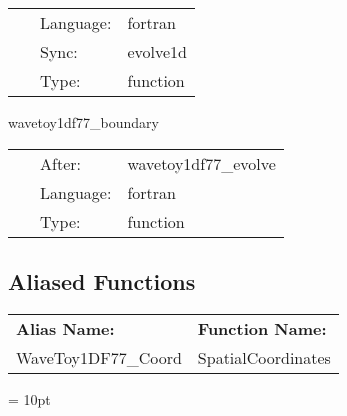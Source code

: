 \hspace{5mm}{\it evolution of 1d wave equation } 


\hspace{5mm}

 \begin{tabular*}{160mm}{cll} 
~ & Language:  & fortran \\ 
~ & Sync:  & evolve1d \\ 
~ & Type:  & function \\ 
\end{tabular*} 


\vspace{5mm}


\hspace{5mm} wavetoy1df77\_boundary 

\hspace{5mm}{\it apply boundary conditions } 


\hspace{5mm}

 \begin{tabular*}{160mm}{cll} 
~ & After:  & wavetoy1df77\_evolve \\ 
~ & Language:  & fortran \\ 
~ & Type:  & function \\ 
\end{tabular*} 


\subsection*{Aliased Functions}

\hspace{5mm}

 \begin{tabular*}{160mm}{ll} 

{\bf Alias Name:} ~~~~~~~ & {\bf Function Name:} \\ 
WaveToy1DF77\_Coord & SpatialCoordinates \\ 
\end{tabular*} 



\vspace{5mm}\parskip = 10pt 
